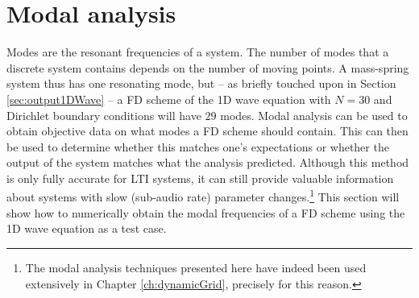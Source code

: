 {{{{\section{Modal analysis}
\label{sec:modalAnalysis}
Modes are the resonant frequencies of a system. The number of modes that a discrete system contains depends on the number of moving points. A mass-spring system thus has one resonating mode, but -- as briefly touched upon in Section \ref{sec:output1DWave} -- a FD scheme of the 1D wave equation with $N = 30$ and Dirichlet boundary conditions will have $29$ modes. Modal analysis can be used to obtain objective data on what modes a FD scheme should contain. This can then be used to determine whether this matches one's expectations or whether the output of the system matches what the analysis predicted. Although this method is only fully accurate for LTI systems, it can still provide valuable information about systems with slow (sub-audio rate) parameter changes.\footnote{The modal analysis techniques presented here have indeed been used extensively in Chapter \ref{ch:dynamicGrid}, precisely for this reason.} This section will show how to numerically obtain the modal frequencies of a FD scheme using the 1D wave equation as a test case.

}}}}
